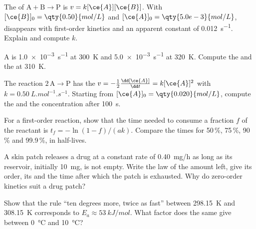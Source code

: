 \begin{exercise}[$\star\star$]\label{exo:b1:rate-laws:7}
The  of $\mathrm{A} + \mathrm{B} \longrightarrow \mathrm{P}$ is $v = k[\ce{A}][\ce{B}]$. With
$[\ce{B}]_0 = \qty{0.50}{mol/L}$ and $[\ce{A}]_0 = \qty{5.0e-3}{mol/L}$,
 disappears with first-order kinetics and an apparent constant of
\qty{0.012}{s^{-1}}. Explain and compute $k$.
\end{exercise}

\begin{exercise}[$\star\star$]\label{exo:b1:rate-laws:8}
A  is \qty{1.0e-3}{s^{-1}} at \qty{300}{K} and
\qty{5.0e-3}{s^{-1}} at \qty{320}{K}. Compute the  and
the  at \qty{310}{K}.
\end{exercise}

\begin{exercise}[$\star\star$]\label{exo:b1:rate-laws:9}
The reaction $2\,\mathrm{A} \longrightarrow \mathrm{P}$ has the  $v = -\frac12\frac{\dd[\ce{A}]}
{\dd t} = k[\ce{A}]^2$ with $k = \qty{0.50}{L.mol^{-1}.s^{-1}}$. Starting
from $[\ce{A}]_0 = \qty{0.020}{mol/L}$, compute the  and the
concentration after \qty{100}{s}.
\end{exercise}

\begin{exercise}[$\star\star\star$]\label{exo:b1:rate-laws:10}
For a first-order reaction, show that the time needed to consume a
fraction $f$ of the reactant is $t_f = -\ln(1 - f)/(ak)$. Compare the
times for 50\,\%, 75\,\%, 90\,\% and 99.9\,\%, in half-lives.
\end{exercise}

\begin{exercise}[$\star\star\star$]\label{exo:b1:rate-laws:11}
A skin patch releases a drug at a constant rate of
\qty{0.40}{mg/h} as long as its reservoir, initially \qty{10}{mg}, is not
empty. Write the law of the amount left, give its order, its  and
the time after which the patch is exhausted. Why do zero-order kinetics
suit a drug patch?
\end{exercise}

\begin{exercise}[$\star\star\star$]\label{exo:b1:rate-laws:12}
Show that the rule ``ten degrees more, twice as fast'' between
\qty{298.15}{K} and \qty{308.15}{K} corresponds to $E_a \approx
\qty{53}{kJ/mol}$. What factor does the same  give
between \qty{0}{\celsius} and \qty{10}{\celsius}?
\end{exercise}

